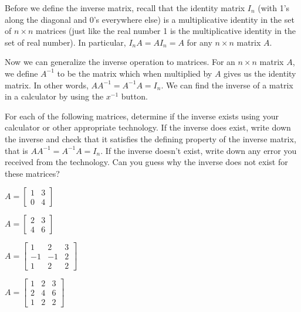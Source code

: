 \begin{pa} \label{pa:2_c} 
\be
\item Before we define the inverse matrix, recall that the identity matrix $I_n$ (with 1's along the diagonal and 0's everywhere else) is a multiplicative identity in the set of $n \times n$ matrices (just like the real number 1 is the multiplicative identity in the set of real number). In particular, $I_nA = AI_n = A$ for any $n \times n$ matrix $A$. 

Now we can generalize the inverse operation to matrices. For an $n\times n$ matrix $A$, we define $A^{-1}$ to be the matrix which when multiplied by $A$ gives us the identity matrix. In other words, $AA^{-1}=A^{-1}A=I_n$. We can find the inverse of a matrix in a calculator by using the $x^{-1}$ button.

For each of the following matrices, determine if the inverse exists using your calculator or other appropriate technology. If the inverse does exist, write down the inverse and check that it satisfies the defining property of the inverse matrix, that is $AA^{-1}=A^{-1}A=I_n$. If the inverse doesn't exist, write down any error you received from the technology. Can you guess why the inverse does not exist for these matrices? \\

\ba
\begin{minipage}{2.0in}
\item $A = \left[ \begin{array}{cc} 1&3 \\ 0&4 \end{array} \right]$
\end{minipage}
\begin{minipage}{2.0in}
\item $A = \left[ \begin{array}{cc} 2&3 \\ 4&6 \end{array} \right]$
\end{minipage}

\begin{minipage}{2.0in}
\item $A = \left[ \begin{array}{rrc} 1&2&3 \\ -1&-1&2\\1&2&2 \end{array} \right]$
\end{minipage}
\begin{minipage}{2.0in}
\item $A = \left[ \begin{array}{rrc} 1&2&3 \\ 2&4&6\\1&2&2 \end{array} \right]$
\end{minipage}


\end{pa}
